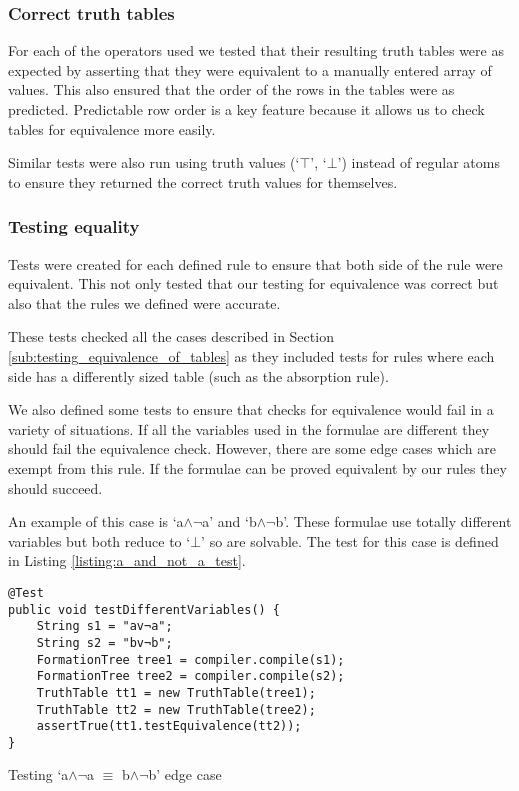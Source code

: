 \documentclass{report}
\begin{document}
\subsubsection{Correct truth tables}

For each of the operators used we tested that their resulting truth tables were as expected by asserting that they were equivalent to a manually entered array of values. This also ensured that the order of the rows in the tables were as predicted. Predictable row order is a key feature because it allows us to check tables for equivalence more easily.

Similar tests were also run using truth values (`$\top$', `$\bot$') instead of regular atoms to ensure they returned the correct truth values for themselves.

\subsubsection{Testing equality}

Tests were created for each defined rule to ensure that both side of the rule were equivalent. This not only tested that our testing for equivalence was correct but also that the rules we defined were accurate.

These tests checked all the cases described in Section \ref{sub:testing_equivalence_of_tables} as they included tests for rules where each side has a differently sized table (such as the absorption rule).

We also defined some tests to ensure that checks for equivalence would fail in a variety of situations. If all the variables used in the formulae are different they should fail the equivalence check. However, there are some edge cases which are exempt from this rule. If the formulae can be proved equivalent by our rules they should succeed. 

An example of this case is `a$\land\lnot$a' and `b$\land\lnot$b'. These formulae use totally different variables but both reduce to `$\bot$' so are solvable. The test for this case is defined in Listing \ref{listing:a_and_not_a_test}.

\begin{listing}[ht]
\begin{verbatim}
@Test
public void testDifferentVariables() {
    String s1 = "av¬a";
    String s2 = "bv¬b";
    FormationTree tree1 = compiler.compile(s1);
    FormationTree tree2 = compiler.compile(s2);
    TruthTable tt1 = new TruthTable(tree1);
    TruthTable tt2 = new TruthTable(tree2);
    assertTrue(tt1.testEquivalence(tt2));
}
\end{verbatim}
\caption{Testing `a$\land\lnot$a $\equiv$ b$\land\lnot$b' edge case}
\label{listing:a_and_not_a_test}
\end{listing}
\end{document}
